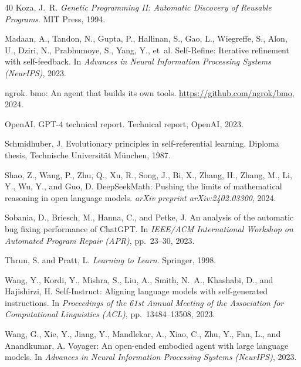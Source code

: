 \documentclass[11pt]{article}
\begin{document}
\begin{thebibliography}{40}
Koza, J.~R.
\newblock \textit{Genetic Programming II: Automatic Discovery of Reusable
  Programs}.
\newblock MIT Press, 1994.

Madaan, A., Tandon, N., Gupta, P., Hallinan, S., Gao, L., Wiegreffe, S.,
  Alon, U., Dziri, N., Prabhumoye, S., Yang, Y., et~al.
\newblock Self-Refine: Iterative refinement with self-feedback.
\newblock In \textit{Advances in Neural Information Processing Systems
  (NeurIPS)}, 2023.

ngrok.
\newblock bmo: An agent that builds its own tools.
\newblock \url{https://github.com/ngrok/bmo}, 2024.

OpenAI.
\newblock GPT-4 technical report.
\newblock Technical report, OpenAI, 2023.

Schmidhuber, J.
\newblock Evolutionary principles in self-referential learning.
\newblock Diploma thesis, Technische Universit{\"a}t M{\"u}nchen, 1987.

Shao, Z., Wang, P., Zhu, Q., Xu, R., Song, J., Bi, X., Zhang, H., Zhang, M.,
  Li, Y., Wu, Y., and Guo, D.
\newblock DeepSeekMath: Pushing the limits of mathematical reasoning in open
  language models.
\newblock \textit{arXiv preprint arXiv:2402.03300}, 2024.

Sobania, D., Briesch, M., Hanna, C., and Petke, J.
\newblock An analysis of the automatic bug fixing performance of ChatGPT.
\newblock In \textit{IEEE/ACM International Workshop on Automated Program
  Repair (APR)}, pp.\ 23--30, 2023.

Thrun, S. and Pratt, L.
\newblock \textit{Learning to Learn}.
\newblock Springer, 1998.

Wang, Y., Kordi, Y., Mishra, S., Liu, A., Smith, N.~A., Khashabi, D., and
  Hajishirzi, H.
\newblock Self-Instruct: Aligning language models with self-generated
  instructions.
\newblock In \textit{Proceedings of the 61st Annual Meeting of the Association
  for Computational Linguistics (ACL)}, pp.\ 13484--13508, 2023.

Wang, G., Xie, Y., Jiang, Y., Mandlekar, A., Xiao, C., Zhu, Y., Fan, L., and
  Anandkumar, A.
\newblock Voyager: An open-ended embodied agent with large language models.
\newblock In \textit{Advances in Neural Information Processing Systems
  (NeurIPS)}, 2023.


\end{thebibliography}
\end{document}
